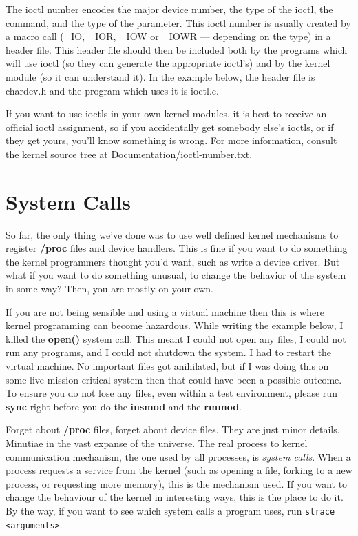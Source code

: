 \documentclass[10pt, oneside]{book}
\begin{document}
The ioctl number encodes the major device number, the type of the ioctl, the command, and the type of the parameter.
This ioctl number is usually created by a macro call (\_IO, \_IOR, \_IOW or \_IOWR --- depending on the type) in a header file.
This header file should then be included both by the programs which will use ioctl (so they can generate the appropriate ioctl's) and by the kernel module (so it can understand it).
In the example below, the header file is chardev.h and the program which uses it is ioctl.c.

If you want to use ioctls in your own kernel modules, it is best to receive an official ioctl assignment, so if you accidentally get somebody else's ioctls, or if they get yours, you'll know something is wrong.
For more information, consult the kernel source tree at Documentation/ioctl-number.txt.




\section{System Calls}
\label{sec:syscall}
So far, the only thing we've done was to use well defined kernel mechanisms to register \textbf{/proc} files and device handlers.
This is fine if you want to do something the kernel programmers thought you'd want, such as write a device driver.
But what if you want to do something unusual, to change the behavior of the system in some way?
Then, you are mostly on your own.

If you are not being sensible and using a virtual machine then this is where kernel programming can become hazardous.
While writing the example below, I killed the \textbf{open()} system call.
This meant I could not open any files, I could not run any programs, and I could not shutdown the system.
I had to restart the virtual machine.
No important files got anihilated, but if I was doing this on some live mission critical system then that could have been a possible outcome.
To ensure you do not lose any files, even within a test environment, please run \textbf{sync} right before you do the \textbf{insmod} and the \textbf{rmmod}.

Forget about \textbf{/proc} files, forget about device files.
They are just minor details.
Minutiae in the vast expanse of the universe.
The real process to kernel communication mechanism, the one used by all processes, is \emph{system calls}.
When a process requests a service from the kernel (such as opening a file, forking to a new process, or requesting more memory), this is the mechanism used.
If you want to change the behaviour of the kernel in interesting ways, this is the place to do it.
By the way, if you want to see which system calls a program uses, run \verb|strace <arguments>|.
\end{document}
